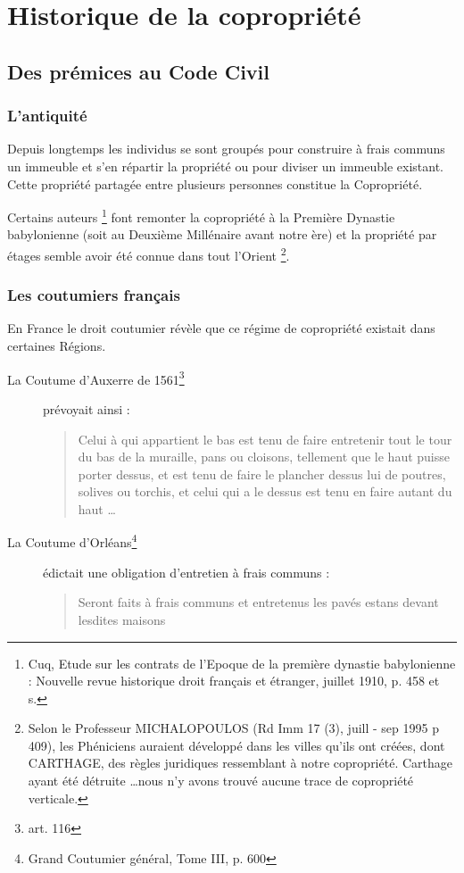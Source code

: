 \chapter{Historique de la copropriété}

\section{Des prémices au Code Civil}
	\subsection{L’antiquité}
		Depuis longtemps les individus se sont groupés pour construire à frais communs un immeuble et s'en répartir la propriété ou pour diviser un immeuble existant. Cette propriété partagée entre plusieurs personnes constitue la Copropriété.
		
		Certains auteurs
		\footnote{Cuq, Etude sur les contrats de l'Epoque de la première dynastie babylonienne : Nouvelle revue historique droit français et étranger, juillet 1910, p. 458 et s.}
		font remonter la copropriété à la Première Dynastie babylonienne (soit au Deuxième Millénaire avant notre ère) et la propriété par étages semble avoir été connue dans tout l'Orient
		\footnote{Selon le Professeur MICHALOPOULOS (Rd Imm 17 (3), juill - sep 1995 p 409), les Phéniciens auraient développé dans les villes qu'ils ont créées, dont CARTHAGE, des règles juridiques ressemblant à notre copropriété. Carthage ayant été détruite \dots nous n’y avons trouvé aucune trace de copropriété verticale.}.
		
	\subsection{Les coutumiers français}
		En France le droit coutumier révèle que ce régime de copropriété existait dans certaines Régions.
		
		\begin{description}
			\item[La Coutume d'Auxerre de 1561\footnote{art. 116}] prévoyait ainsi :
				\begin{quote}
					Celui à qui appartient le bas est tenu de faire entretenir tout le tour du bas de la muraille, pans ou cloisons, tellement que le haut puisse porter dessus, et est tenu de faire le plancher dessus lui de poutres, solives ou torchis, et celui qui a le dessus est tenu en faire autant du haut \dots
				\end{quote}
			\item[La Coutume d'Orléans\footnote{Grand Coutumier général, Tome III, p. 600}] édictait une obligation d'entretien à frais communs :
				\begin{quote}
					Seront faits à frais communs et entretenus les pavés estans devant lesdites maisons
				\end{quote}
		\end{description}
		
